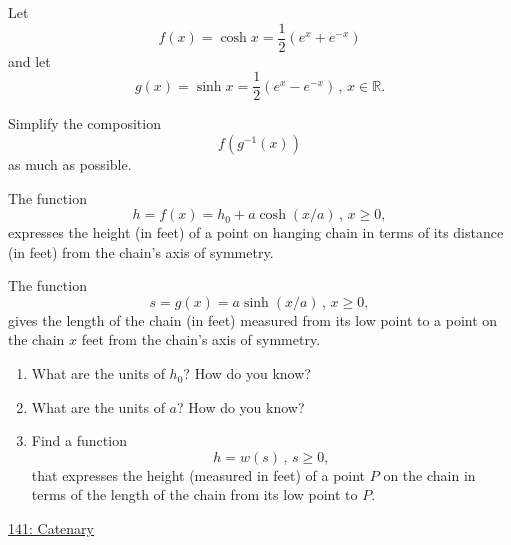 \documentclass{ximera}
\begin{document}
\begin{question} \label{QLfeenvd}
Let
\[
     f(x) = \cosh x = \frac{1}{2}\left( e^x + e^{-x} \right)
\]
and let
\[
    g(x) = \sinh x = \frac{1}{2}\left( e^x - e^{-x} \right) \, , \, x\in \mathbb{R}.
\]

Simplify the composition
\[
       f(g^{-1}(x))
\]
as much as possible.
\end{question}

\begin{question} \label{Qmdfmzmcp023}
The function
\[
    h = f(x) = h_0 + a\cosh(x/a) \, , \, x\geq 0,
\]
expresses the height (in feet) of a point on hanging chain in terms of its distance (in feet) from the chain's axis of symmetry.

The function
\[
      s = g(x) = a\sinh(x/a) \, , \, x\geq 0,
\]
gives the length of the chain (in feet) measured from its low point to a point on the chain $x$ feet from the chain's axis of symmetry.

\begin{enumerate}

\item What are the units of $h_0$? How do you know?

\item What are the units of $a$? How do you know?

\item Find a function
\[
     h = w(s) \, , \, s\geq 0,
\]
that expresses the height (measured in feet) of a point $P$ on the chain in terms of the length of the chain from its low point to $P$.

\end{enumerate}

\begin{onlineOnly}
    \begin{center}
\end{center}
\end{onlineOnly}

\href{https://www.desmos.com/calculator/5oppqdy2l1}{141: Catenary}


\end{question}
\end{document}

